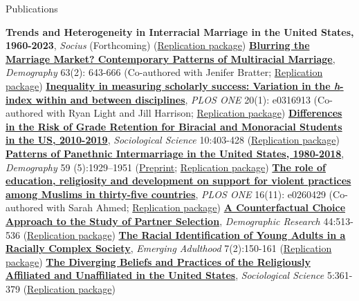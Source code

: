 \begin{rubric}{Publications}

\entry*[2026] \textbf{Trends and Heterogeneity in Interracial Marriage in the United States, 1960-2023}, \emph{Socius} (Forthcoming) (\href{https://github.com/AaronGullickson/inter_partner_trends}{Replication package}) 
\entry*[2026] \textbf{\href{https://doi.org/10.1215/00703370-12530612}{Blurring the Marriage Market? Contemporary Patterns of Multiracial Marriage}}, \emph{Demography} 63(2): 643-666 (Co-authored with Jenifer Bratter; \href{https://github.com/AaronGullickson/multiracial_intermar}{Replication package}) 
\entry*[2025] \textbf{\href{https://journals.plos.org/plosone/article?id=10.1371/journal.pone.0316913}{Inequality in measuring scholarly success: Variation in the \emph{h}-index within and between disciplines}}, \emph{PLOS ONE} 20(1): e0316913 (Co-authored with Ryan Light and Jill Harrison; \href{https://github.com/lightsociologist/hirsch_test}{Replication package}) 
\entry*[2023] \textbf{\href{https://sociologicalscience.com/articles-v10-13-403/}{Differences in the Risk of Grade Retention for Biracial and Monoracial Students in the US, 2010-2019}}, \emph{Sociological Science} 10:403-428 (\href{https://github.com/AaronGullickson/mrace_grade_retention}{Replication package}) 
\entry*[2022] \textbf{\href{https://doi.org/10.1215/00703370-10218826}{Patterns of Panethnic Intermarriage in the United States, 1980-2018}}, \emph{Demography} 59 (5):1929--1951 (\href{https://osf.io/preprints/socarxiv/dz5pm}{Preprint}; \href{https://github.com/AaronGullickson/panethnicity_intermar}{Replication package}) 
\entry*[2021] \textbf{\href{https://doi.org/10.1371/journal.pone.0260429}{The role of education, religiosity and development on support for violent practices among Muslims in thirty-five countries}}, \emph{PLOS ONE} 16(11): e0260429 (Co-authored with Sarah Ahmed; \href{https://github.com/AaronGullickson/muslim_attitudes}{Replication package}) 
\entry*[2021] \textbf{\href{https://dx.doi.org/10.4054/DemRes.2021.44.22}{A Counterfactual Choice Approach to the Study of Partner Selection}}, \emph{Demographic Research} 44:513-536 (\href{https://github.com/AaronGullickson/marmodel_analysis}{Replication package}) 
\entry*[2019] \textbf{\href{https://doi.org/10.1177/2167696818790306}{The Racial Identification of Young Adults in a Racially Complex Society}}, \emph{Emerging Adulthood} 7(2):150-161 (\href{https://github.com/AaronGullickson/racial_ident_nlsy}{Replication package}) 
\entry*[2018] \textbf{\href{https://dx.doi.org/10.15195/v5.a16}{The Diverging Beliefs and Practices of the Religiously Affiliated and Unaffiliated in the United States}}, \emph{Sociological Science} 5:361-379 (\href{https://github.com/AaronGullickson/nones_beliefs_analysis}{Replication package}) 

\end{rubric}
